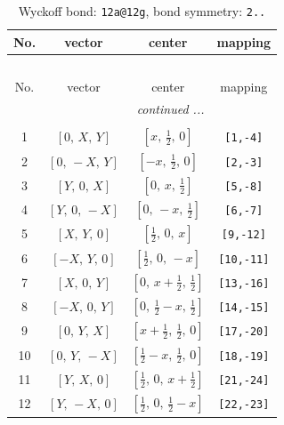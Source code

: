 \documentclass[fleqn,8pt]{jsarticle}
\begin{document}
\begin{longtable}{cccc}
\caption{Wyckoff bond: {\tt 12a@12g}, bond symmetry: {\tt 2..}}
 \\
 \hline \hline
No. & vector & center & mapping \\ \hline \endfirsthead

\multicolumn{3}{l}{\tablename\ \thetable{}} \\
 \hline \hline
No. & vector & center & mapping \\ \hline \endhead

 \hline \hline
\multicolumn{3}{r}{\footnotesize\it continued ...} \\ \endfoot

 \hline \hline
\multicolumn{3}{r}{} \\ \endlastfoot

1 & $\left[ 0,\, X,\, Y \right]$ & $\left[ x,\, \frac{1}{2},\, 0 \right]$ & {\tt [1,-4]} \\ \hline
2 & $\left[ 0,\, - X,\, Y \right]$ & $\left[ - x,\, \frac{1}{2},\, 0 \right]$ & {\tt [2,-3]} \\ \hline
3 & $\left[ Y,\, 0,\, X \right]$ & $\left[ 0,\, x,\, \frac{1}{2} \right]$ & {\tt [5,-8]} \\ \hline
4 & $\left[ Y,\, 0,\, - X \right]$ & $\left[ 0,\, - x,\, \frac{1}{2} \right]$ & {\tt [6,-7]} \\ \hline
5 & $\left[ X,\, Y,\, 0 \right]$ & $\left[ \frac{1}{2},\, 0,\, x \right]$ & {\tt [9,-12]} \\ \hline
6 & $\left[ - X,\, Y,\, 0 \right]$ & $\left[ \frac{1}{2},\, 0,\, - x \right]$ & {\tt [10,-11]} \\ \hline
7 & $\left[ X,\, 0,\, Y \right]$ & $\left[ 0,\, x + \frac{1}{2},\, \frac{1}{2} \right]$ & {\tt [13,-16]} \\ \hline
8 & $\left[ - X,\, 0,\, Y \right]$ & $\left[ 0,\, \frac{1}{2} - x,\, \frac{1}{2} \right]$ & {\tt [14,-15]} \\ \hline
9 & $\left[ 0,\, Y,\, X \right]$ & $\left[ x + \frac{1}{2},\, \frac{1}{2},\, 0 \right]$ & {\tt [17,-20]} \\ \hline
10 & $\left[ 0,\, Y,\, - X \right]$ & $\left[ \frac{1}{2} - x,\, \frac{1}{2},\, 0 \right]$ & {\tt [18,-19]} \\ \hline
11 & $\left[ Y,\, X,\, 0 \right]$ & $\left[ \frac{1}{2},\, 0,\, x + \frac{1}{2} \right]$ & {\tt [21,-24]} \\ \hline
12 & $\left[ Y,\, - X,\, 0 \right]$ & $\left[ \frac{1}{2},\, 0,\, \frac{1}{2} - x \right]$ & {\tt [22,-23]} \\
\end{longtable}
\end{document}
